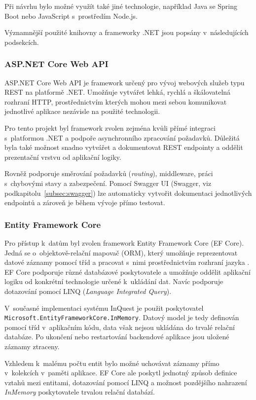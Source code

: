 \documentclass[
  biblatex,
  figures,
  tables,
  glossaries,
  index
]{kidiplom}
\begin{document}
Při návrhu bylo možné využít také jiné technologie, například Java se Spring Boot nebo JavaScript s~prostředím Node.js. 

Významnější použité knihovny a frameworky .NET jsou popsány v~následujících podsekcích.


\subsubsection{ASP.NET Core Web API}
ASP.NET Core Web API je framework určený pro vývoj webových služeb typu REST na platformě .NET. Umožňuje vytvářet lehká, rychlá a škálovatelná rozhraní HTTP, prostřednictvím kterých mohou mezi sebou komunikovat jednotlivé aplikace nezávisle na použité technologii.

Pro tento projekt byl framework zvolen zejména kvůli přímé integraci s~platformou .NET a podpoře asynchronního zpracování požadavků. Důležitá byla také možnost snadno vytvářet a dokumentovat REST endpointy a oddělit prezentační vrstvu od aplikační logiky.

Rovněž podporuje směrování požadavků (\textit{routing}), middleware, práci s~chybovými stavy a zabezpečení. Pomocí Swagger UI (Swagger, viz podkapitolu~\ref{subsec:swagger}) lze automaticky vytvořit dokumentaci jednotlivých endpointů a zároveň je během vývoje přímo testovat.~\cite{aspnetwebapi}


\subsubsection{Entity Framework Core}
Pro přístup k~datům byl zvolen framework Entity Framework Core (EF Core). Jedná se o~objektově-relační mapovač (ORM), který umožňuje reprezentovat datové záznamy pomocí tříd a pracovat s~nimi prostřednictvím rozhraní jazyka \csharp{}. EF Core podporuje různé databázové poskytovatele a umožňuje oddělit aplikační logiku od konkrétní technologie určené k~ukládání dat. Navíc podporuje dotazování pomocí LINQ (\textit{Language Integrated Query}).~\cite{efcore}

V~současné implementaci systému InQuest je použit poskytovatel \linebreak{} \texttt{Microsoft.EntityFrameworkCore.InMemory}. Datový model je tedy definován pomocí tříd v~aplikačním kódu, data však nejsou ukládána do trvalé relační databáze. Po ukončení nebo restartování backendové aplikace jsou uložené záznamy ztraceny.

Vzhledem k~malému počtu entit bylo možné uchovávat záznamy přímo v~kolekcích v~paměti aplikace. EF Core ale poskytl jednotný způsob definice vztahů mezi entitami, dotazování pomocí LINQ a možnost pozdějšího nahrazení \textit{InMemory} poskytovatele trvalou relační databází.
\end{document}
